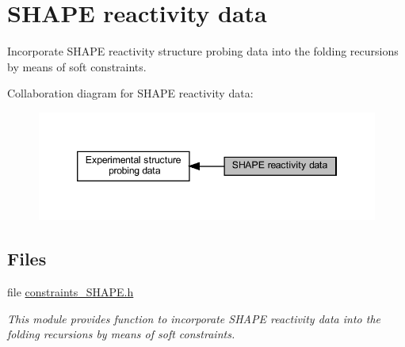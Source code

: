 \hypertarget{group__SHAPE__reactivities}{}\section{S\+H\+A\+PE reactivity data}
\label{group__SHAPE__reactivities}


Incorporate S\+H\+A\+PE reactivity structure probing data into the folding recursions by means of soft constraints.  


Collaboration diagram for S\+H\+A\+PE reactivity data\+:
\nopagebreak
\begin{figure}[H]
\begin{center}
\leavevmode
\includegraphics[width=346pt]{group__SHAPE__reactivities}
\end{center}
\end{figure}
\subsection*{Files}
\begin{DoxyCompactItemize}
\item 
file \hyperlink{constraints__SHAPE_8h}{constraints\+\_\+\+S\+H\+A\+P\+E.\+h}
\begin{DoxyCompactList}\small\item\em This module provides function to incorporate S\+H\+A\+PE reactivity data into the folding recursions by means of soft constraints. \end{DoxyCompactList}\end{DoxyCompactItemize}
